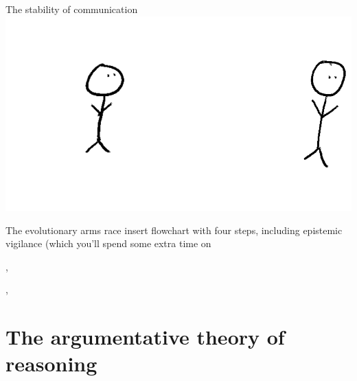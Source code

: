 \documentclass[xcolor=table]{beamer}       %
\begin{document}
\begin{frame}{The stability of communication}
    \includegraphics[width=\textwidth]{img/stability-communication-4.png}
\end{frame}

\begin{frame}{The evolutionary arms race}
    insert flowchart with four steps, including epistemic vigilance (which you'll spend some extra time on

    \scriptsize{\citet{Sperber01}, }

    \scriptsize{\citet{Sperber10}, }
\end{frame}

\section{The argumentative theory of reasoning}
\end{document}
